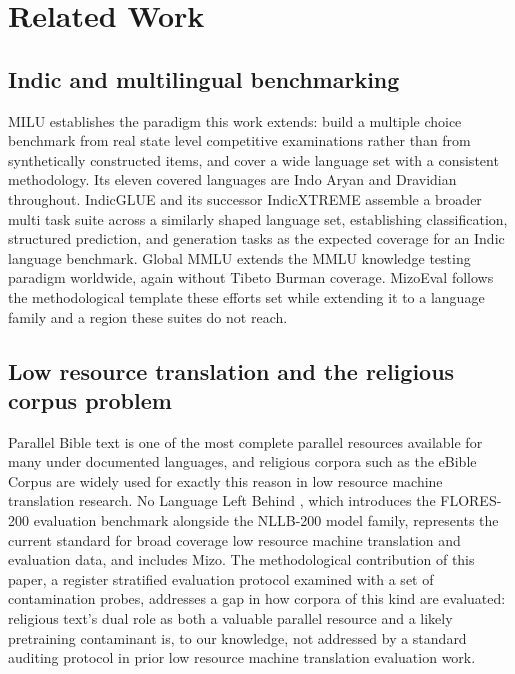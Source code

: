 \documentclass[11pt,a4paper]{article}
\begin{document}
\section{Related Work}
\label{sec:related}

\subsection{Indic and multilingual benchmarking}

MILU \citep{verma2025milu} establishes the paradigm this work extends: build a multiple choice benchmark from real state level competitive examinations rather than from synthetically constructed items, and cover a wide language set with a consistent methodology. Its eleven covered languages are Indo Aryan and Dravidian throughout. IndicGLUE \citep{kakwani2020indicnlpsuite} and its successor IndicXTREME \citep{doddapaneni2023indicxtreme} assemble a broader multi task suite across a similarly shaped language set, establishing classification, structured prediction, and generation tasks as the expected coverage for an Indic language benchmark. Global MMLU \citep{singh2024globalmmlu} extends the MMLU knowledge testing paradigm worldwide, again without Tibeto Burman coverage. MizoEval follows the methodological template these efforts set while extending it to a language family and a region these suites do not reach.

\subsection{Low resource translation and the religious corpus problem}

Parallel Bible text is one of the most complete parallel resources available for many under documented languages, and religious corpora such as the eBible Corpus \citep{akerman2023ebible} are widely used for exactly this reason in low resource machine translation research. No Language Left Behind \citep{nllbteam2022}, which introduces the FLORES-200 evaluation benchmark alongside the NLLB-200 model family, represents the current standard for broad coverage low resource machine translation and evaluation data, and includes Mizo. The methodological contribution of this paper, a register stratified evaluation protocol examined with a set of contamination probes, addresses a gap in how corpora of this kind are evaluated: religious text's dual role as both a valuable parallel resource and a likely pretraining contaminant is, to our knowledge, not addressed by a standard auditing protocol in prior low resource machine translation evaluation work.
\end{document}
